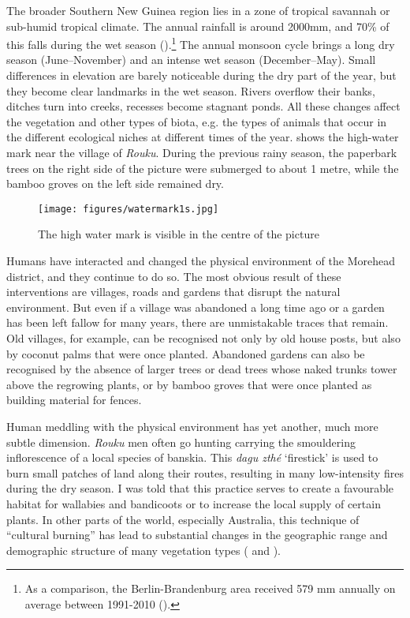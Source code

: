 The broader Southern New Guinea region lies in a zone of tropical savannah or sub-humid tropical climate. The annual rainfall is around 2000mm, and 70\% of this falls during the wet season (\cite[12]{Paijmans:1971morehead}).\footnote{As a comparison, the Berlin-Brandenburg area received 579 mm annually on average between 1991-2010 (\cite{Senstadt:2022ew}).} The annual monsoon cycle brings a long dry season (June--November) and an intense wet season (December--May).  Small differences in elevation are barely noticeable during the dry part of the year, but they become clear landmarks in the wet season. Rivers overflow their banks, ditches turn into creeks, recesses become stagnant ponds. All these changes affect the vegetation and other types of biota, e.g. the types of animals that occur in the different ecological niches at different times of the year.  shows the high-water mark near the village of \textit{Rouku}. During the previous rainy season, the paperbark trees on the right side of the picture were submerged to about 1 metre, while the bamboo groves on the left side remained dry.

\begin{figure}
    \texttt{[image: figures/watermark1s.jpg]}
    \caption{The high water mark is visible in the centre of the picture}
    \label{fig:watermark1}
\end{figure}

Humans have interacted and changed the physical environment of the Morehead district, and they continue to do so. The most obvious result of these interventions are villages, roads and gardens that disrupt the natural environment. But even if a village was abandoned a long time ago or a garden has been left fallow for many years, there are unmistakable traces that remain. Old villages, for example, can be recognised not only by old house posts, but also by coconut palms that were once planted. Abandoned gardens can also be recognised by the absence of larger trees or dead trees whose naked trunks tower above the regrowing plants, or by bamboo groves that were once planted as building material for fences.

Human meddling with the physical environment has yet another, much more subtle dimension. \textit{Rouku} men often go hunting carrying the smouldering inflorescence of a local species of banskia. This \textit{dagu zthé} `firestick' is used to burn small patches of land along their routes, resulting in many low-intensity fires during the dry season. I was told that this practice serves to create a favourable habitat for wallabies and bandicoots or to increase the local supply of certain plants. In other parts of the world, especially Australia, this technique of ``cultural burning'' has lead to substantial changes in the geographic range and demographic structure of many vegetation types (\cite[217ff.]{Flannery:2002bs} and \cite{Bowman:1998cl}).

